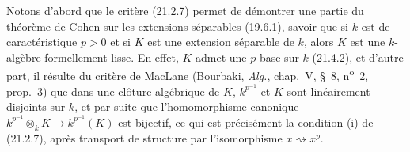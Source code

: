 \begin{env}[21.5.1]
\label{0.21.5.1-fr}
Notons d'abord que le critère (21.2.7) permet de démontrer une partie du
théorème de Cohen sur les extensions séparables (19.6.1), savoir que si $k$
est de caractéristique $p>0$ et si $K$ est une extension séparable de $k$,
alors $K$ est une $k$-algèbre formellement lisse. En effet, $K$ admet une
$p$-base sur $k$ (21.4.2), et d'autre part, il résulte du critère de MacLane
(Bourbaki, \emph{Alg.}, chap.~V, §~8, n\textsuperscript{o}~2, prop.~3) que dans une
clôture algébrique de $K$, $k^{p^{-1}}$ et $K$ sont linéairement disjoints sur
$k$, et par suite que l'homomorphisme canonique
$k^{p^{-1}}\otimes_k K\to k^{p^{-1}}(K)$ est bijectif, ce qui est précisément
la condition (i) de (21.2.7), après transport de structure par
l'isomorphisme $x\rightsquigarrow x^p$.
\end{env}
